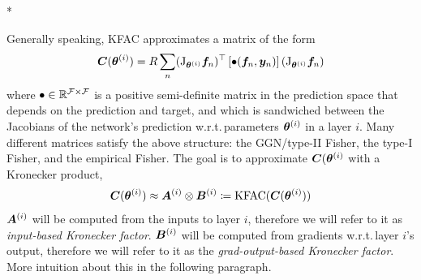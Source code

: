 \switchcolumn[1]*
\switchcolumn[0]

Generally speaking, KFAC approximates a matrix of the form
\begin{align*}
  {\bm{C}}({\bm{\theta}}^{(i)})
  = R \sum_n
  (\mathrm{J}_{{\bm{\theta}}^{(i)}} {\bm{f}}_n)^{\top}
  \left[ \bullet({\bm{f}}_n, {\bm{y}}_n) \right]
  (\mathrm{J}_{{\bm{\theta}}^{(i)}} {\bm{f}}_n)
\end{align*}
where $\bullet \in {\mathbb{R}}^{{\mathcal{F}} \times {\mathcal{F}}}$ is a positive semi-definite matrix in the prediction space that depends on the prediction and target, and which is sandwiched between the Jacobians of the network's prediction w.r.t.\,parameters ${\bm{\theta}}^{(i)}$ in a layer $i$.
Many different matrices satisfy the above structure: the GGN/type-II Fisher, the type-I Fisher, and the empirical Fisher.
The goal is to approximate ${\bm{C}}({\bm{\theta}}^{(i)}$ with a Kronecker product,
\begin{align*}
  {\bm{C}}({\bm{\theta}}^{(i)})
  \approx
  {\bm{A}}^{(i)} \otimes {\bm{B}}^{(i)}
  \coloneq
  \mathrm{KFAC}({\bm{C}}({\bm{\theta}}^{(i)}))
\end{align*}
${\bm{A}}^{(i)}$ will be computed from the inputs to layer $i$, therefore we will refer to it as \emph{input-based Kronecker factor}.
${\bm{B}}^{(i)}$ will be computed from gradients w.r.t.\,layer $i$'s output, therefore we will refer to it as the \emph{grad-output-based Kronecker factor}.
More intuition about this in the following paragraph.

